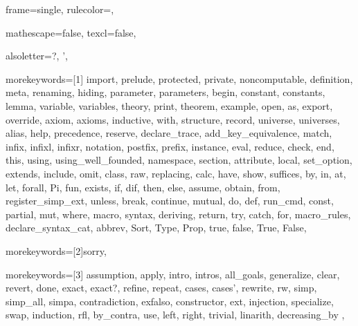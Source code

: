 
 {


frame=single,
rulecolor=\color{bordercolor},


mathescape=false,
texcl=false,

alsoletter={?, '},

morekeywords=[1]{
import, prelude, protected, private, noncomputable, definition, meta, renaming,
hiding, parameter, parameters, begin, constant, constants,
lemma, variable, variables, theory,
print, theorem, example,
open, as, export, override, axiom, axioms, inductive, with,
structure, record, universe, universes,
alias, help, precedence, reserve, declare_trace, add_key_equivalence,
match, infix, infixl, infixr, notation, postfix, prefix, instance,
eval, reduce, check, end, this,
using, using_well_founded, namespace, section,
attribute, local, set_option, extends, include, omit, class,
raw, replacing,
calc, have, show, suffices, by, in, at, let, forall, Pi, fun,
exists, if, dif, then, else, assume, obtain, from, register_simp_ext, unless, break, continue,
mutual, do, def, run_cmd, const,
partial, mut, where, macro, syntax, deriving,
return, try, catch, for, macro_rules, declare_syntax_cat, abbrev,
Sort, Type, Prop,
true, false, True, False},

morekeywords=[2]{sorry},

morekeywords=[3]{
assumption,
apply, intro, intros, all_goals,
generalize, clear, revert, done, exact, exact?,
refine, repeat, cases, cases', rewrite, rw,
simp, simp_all, simpa, contradiction, exfalso,
constructor, ext, injection, specialize, swap,
induction, rfl, by_contra, use, left, right, trivial, linarith,
decreasing_by
},


}
